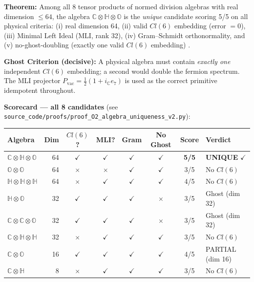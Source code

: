 \begin{tcolorbox}[colback=blue!5!white, colframe=blue!50!black, title={Proof O2 — Uniqueness of $\mathbb{C}\otimes\mathbb{H}\otimes\mathbb{O}$: Full 8-Candidate Scan (UNIQUENESS PROVEN)}]
\textbf{Theorem:} Among all 8 tensor products of normed division algebras with real dimension $\leq 64$, the algebra $\mathbb{C}\otimes\mathbb{H}\otimes\mathbb{O}$ is the \emph{unique} candidate scoring 5/5 on all physical criteria: (i) real dimension 64, (ii) valid $Cl(6)$ embedding (error $= 0$), (iii) Minimal Left Ideal (MLI, rank 32), (iv) Gram--Schmidt orthonormality, and (v) no-ghost-doubling (exactly one valid $Cl(6)$ embedding) \cite{Baez2002Octonions}.

\textbf{Ghost Criterion (decisive):} A physical algebra must contain \emph{exactly one} independent $Cl(6)$ embedding; a second would double the fermion spectrum. The MLI projector $P_\mathrm{vac} = \tfrac{1}{2}(1 + i_\mathbb{C} e_7)$ is used as the correct primitive idempotent throughout.

\textbf{Scorecard — all 8 candidates} (see \texttt{source\_\allowbreak code/\allowbreak proofs/\allowbreak proof\_\allowbreak O2\_\allowbreak algebra\_\allowbreak uniqueness\_\allowbreak v2.py}):
\begin{center}
\small
\begin{tabular}{lrccccc l}
\hline
Algebra & Dim & $Cl(6)$? & MLI? & Gram & No Ghost & Score & Verdict \\
\hline
$\mathbb{C}\otimes\mathbb{H}\otimes\mathbb{O}$ & 64 & $\checkmark$ & $\checkmark$ & $\checkmark$ & $\checkmark$ & \textbf{5/5} & \textbf{UNIQUE} $\checkmark$ \\
$\mathbb{O}\otimes\mathbb{O}$ & 64 & $\times$ & $\times$ & $\checkmark$ & $\checkmark$ & 3/5 & No $Cl(6)$ \\
$\mathbb{H}\otimes\mathbb{H}\otimes\mathbb{H}$ & 64 & $\times$ & $\checkmark$ & $\checkmark$ & $\checkmark$ & 4/5 & No $Cl(6)$ \\
$\mathbb{H}\otimes\mathbb{O}$ & 32 & $\checkmark$ & $\checkmark$ & $\checkmark$ & $\times$ & 3/5 & Ghost (dim 32) \\
$\mathbb{C}\otimes\mathbb{C}\otimes\mathbb{O}$ & 32 & $\checkmark$ & $\checkmark$ & $\checkmark$ & $\times$ & 3/5 & Ghost (dim 32) \\
$\mathbb{C}\otimes\mathbb{H}\otimes\mathbb{H}$ & 32 & $\times$ & $\checkmark$ & $\checkmark$ & $\checkmark$ & 3/5 & No $Cl(6)$ \\
$\mathbb{C}\otimes\mathbb{O}$ & 16 & $\checkmark$ & $\checkmark$ & $\checkmark$ & $\checkmark$ & 4/5 & PARTIAL (dim 16) \\
$\mathbb{C}\otimes\mathbb{H}$ & 8 & $\times$ & $\checkmark$ & $\checkmark$ & $\checkmark$ & 3/5 & No $Cl(6)$ \\
\hline
\end{tabular}
\end{center}


\end{tcolorbox}
